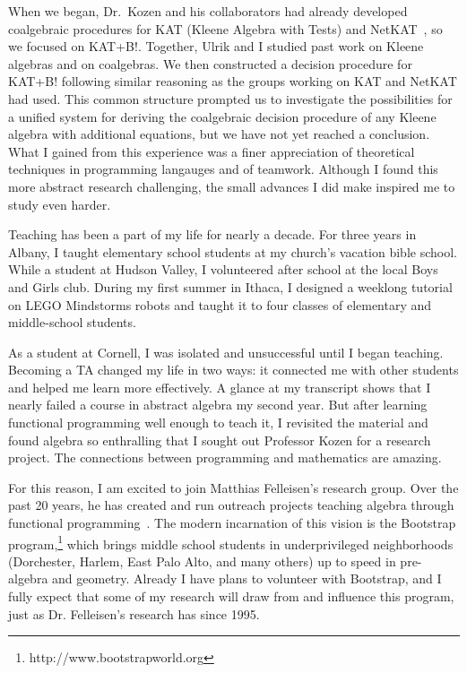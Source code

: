 \documentclass[12pt]{article}
\newcommand{\hdr}[2]{\vspace{-0.4cm}{\flushleft{\hrulefill\\\textbf{#1}\hfill{#2}\\\vspace{-0.2cm}\hrulefill}}\vspace{0.1cm}}
\begin{document}
When we began, Dr.~Kozen and his collaborators had already developed coalgebraic procedures for KAT (Kleene Algebra with Tests) and NetKAT~\cite{foster2014coalgebraic}, so we focused on KAT+B!.
Together, Ulrik and I studied past work on Kleene algebras and on coalgebras.
We then constructed a decision procedure for KAT+B! following similar reasoning as the groups working on KAT and NetKAT had used.
This common structure prompted us to investigate the possibilities for a unified system for deriving the coalgebraic decision procedure of any Kleene algebra with additional equations, but we have not yet reached a conclusion.
What I gained from this experience was a finer appreciation of theoretical techniques in programming langauges and of teamwork.
Although I found this more abstract research challenging, the small advances I did make inspired me to study even harder.

\hdr{Broader Impacts}{}

Teaching has been a part of my life for nearly a decade.
For three years in Albany, I taught elementary school students at my church's vacation bible school.
While a student at Hudson Valley, I volunteered after school at the local Boys and Girls club.
During my first summer in Ithaca, I designed a weeklong tutorial on LEGO Mindstorms robots and taught it to four classes of elementary and middle-school students.

As a student at Cornell, I was isolated and unsuccessful until I began teaching.
Becoming a TA changed my life in two ways: it connected me with other students and helped me learn more effectively.
A glance at my transcript shows that I nearly failed a course in abstract algebra my second year.
But after learning functional programming well enough to teach it, I revisited the material and found algebra so enthralling that I sought out Professor Kozen for a research project.
The connections between programming and mathematics are amazing.

For this reason, I am excited to join Matthias Felleisen's research group.
Over the past 20 years, he has created and run outreach projects teaching algebra through functional programming~\cite{felleisen2010teachscheme}.
The modern incarnation of this vision is the Bootstrap program,\footnote{http://www.bootstrapworld.org} which brings middle school students in underprivileged neighborhoods (Dorchester, Harlem, East Palo Alto, and many others) up to speed in pre-algebra and geometry.
Already I have plans to volunteer with Bootstrap, and I fully expect that some of my research will draw from and influence this program, just as Dr. Felleisen's research has since 1995.

\vfill
\renewcommand{\section}[2]{}
\begin{multicols}{2}
\footnotesize


\end{multicols}
\end{document}
